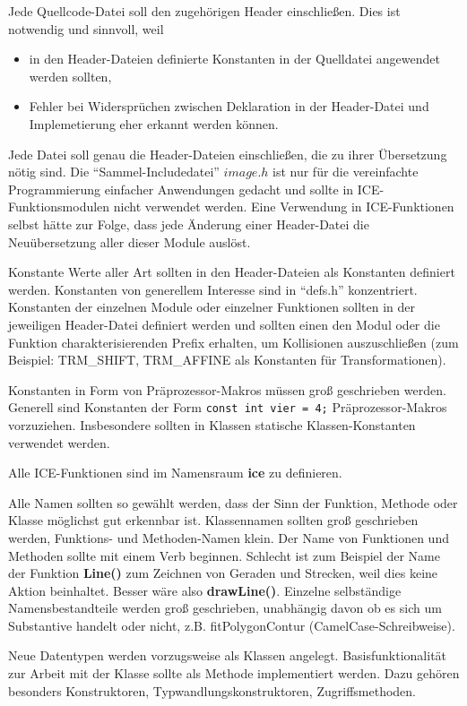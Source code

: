 \documentclass[10pt,titlepage]{article}
\begin{document}
{{Jede Quellcode-Datei soll den zugehörigen Header einschließen. Dies ist 
notwendig und sinnvoll, weil
\begin{itemize}
\item in den Header-Dateien definierte Konstanten in der Quelldatei angewendet
  werden sollten,
\item Fehler bei Widersprüchen zwischen Deklaration in der Header-Datei und 
Implemetierung eher erkannt werden können.
\end{itemize}

Jede Datei soll genau die Header-Dateien einschließen, die zu ihrer
Übersetzung nötig sind. 
Die ``Sammel-Includedatei'' $image.h$ ist nur für die vereinfachte
Programmierung einfacher Anwendungen gedacht und sollte in 
ICE-Funktionsmodulen nicht verwendet werden. Eine Verwendung in 
ICE-Funktionen selbst hätte zur Folge, dass jede Änderung einer 
Header-Datei die Neuübersetzung aller dieser Module auslöst.

Konstante Werte aller Art sollten in den Header-Dateien als Konstanten 
definiert werden. Konstanten von generellem Interesse sind in ``defs.h''
konzentriert. Konstanten der einzelnen Module oder einzelner Funktionen
sollten in der jeweiligen Header-Datei definiert werden und sollten einen
den Modul oder die Funktion charakterisierenden Prefix erhalten, um
Kollisionen auszuschließen (zum Beispiel: TRM\_SHIFT, TRM\_AFFINE als 
Konstanten für Transformationen). 

Konstanten in Form von Präprozessor-Makros müssen groß geschrieben werden.
Generell sind Konstanten der Form \verb+const int vier = 4;+ Präprozessor-Makros
vorzuziehen. Insbesondere sollten in Klassen statische Klassen-Konstanten
verwendet werden.

Alle ICE-Funktionen sind im Namensraum {\bf ice} zu definieren.

Alle Namen sollten so gewählt werden, dass der Sinn der Funktion, Methode oder
Klasse möglichst gut erkennbar ist. Klassennamen sollten groß geschrieben 
werden, Funktions- und Methoden-Namen klein.
Der Name von Funktionen und Methoden sollte mit einem Verb beginnen.
Schlecht ist zum Beispiel der Name der Funktion {\bf Line()} zum 
Zeichnen von Geraden und Strecken, weil dies keine Aktion beinhaltet. 
Besser wäre also {\bf drawLine()}. 
Einzelne selbständige Namensbestandteile werden groß geschrieben, 
unabhängig davon ob es sich um Substantive handelt oder nicht, 
z.B. fitPolygonContur (CamelCase-Schreibweise).

Neue Datentypen werden vorzugsweise als Klassen angelegt. 
Basisfunktionalität zur Arbeit mit der Klasse sollte als Methode 
implementiert werden. Dazu gehören besonders Konstruktoren, 
Typwandlungskonstruktoren, Zugriffsmethoden.

}}
\end{document}
